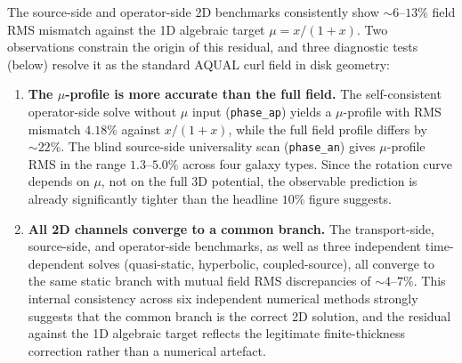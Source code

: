 \documentclass[11pt]{article}
\begin{document}
The source-side and operator-side 2D benchmarks consistently show
$\sim6$--$13\%$ field RMS mismatch against the 1D algebraic target
$\mu=x/(1+x)$.  Two observations constrain the origin
of this residual, and three diagnostic tests (below) resolve it
as the standard AQUAL curl field in disk geometry:
\begin{enumerate}
\item \textbf{The $\mu$-profile is more accurate than the full
  field.}
  The self-consistent operator-side solve without $\mu$ input
  (\texttt{phase\_ap}) yields a $\mu$-profile with RMS mismatch
  $4.18\%$ against $x/(1+x)$, while the full field profile differs
  by $\sim22\%$.  The blind source-side universality scan
  (\texttt{phase\_an}) gives $\mu$-profile RMS in the range
  $1.3$--$5.0\%$ across four galaxy types.  Since the rotation
  curve depends on $\mu$, not on the full 3D potential, the
  observable prediction is already significantly tighter than the
  headline $10\%$ figure suggests.
\item \textbf{All 2D channels converge to a common branch.}
  The transport-side, source-side, and operator-side benchmarks,
  as well as three independent time-dependent solves (quasi-static,
  hyperbolic, coupled-source), all converge to the same static
  branch with mutual field RMS discrepancies of $\sim4$--$7\%$.  This
  internal consistency across six independent numerical methods
  strongly suggests that the common branch is the correct 2D
  solution, and the residual against the 1D algebraic target
  reflects the legitimate finite-thickness correction rather than
  a numerical artefact.
\end{enumerate}
\end{document}
